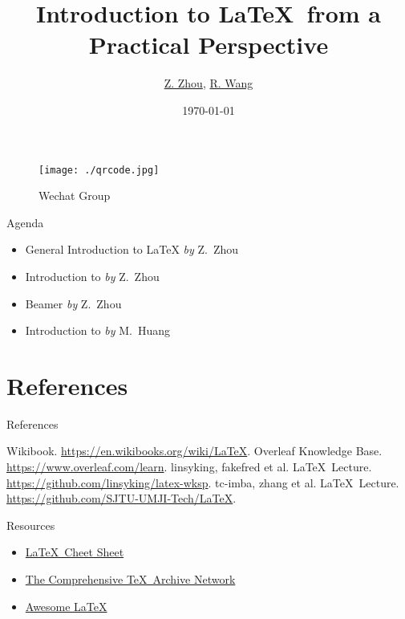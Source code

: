 \documentclass[aspectratio=169]{beamer}
\title{Introduction to \LaTeX\  from a Practical Perspective}
\author{\hyperlink{https://github.com/TechJI-2023/latex_wksp}{Z. Zhou}, \hyperlink{https://github.com/Hydraallen}{R. Wang}}
\institute{TechJI}
\date{\today}
\newcommand{\packagename}[1]{\structure{\texttt{#1}}}
\begin{document}
\begin{frame}
    \titlepage
    \begin{figure}
        \centering
        \caption*{Wechat Group}
        \texttt{[image: ./qrcode.jpg]}
    \end{figure}
\end{frame}

\begin{frame}{Agenda}
    \begin{itemize}
        \item General Introduction to \LaTeX \hspace*{\fill} \textit{by} Z.~Zhou
        \item Introduction to \packagename{Tikz} \hspace*{\fill} \textit{by} Z.~Zhou
        \item Beamer \hspace*{\fill} \textit{by} Z.~Zhou
        \item Introduction to \packagename{Bibtex} \hspace*{\fill} \textit{by} M.~Huang
    \end{itemize}
\end{frame}







\section*{References}

\begin{frame}{References}
    \begin{thebibliography}{9}
        Wikibook. \url{https://en.wikibooks.org/wiki/LaTeX}.
        Overleaf Knowledge Base. \url{https://www.overleaf.com/learn}.
        linsyking, fakefred et al. \LaTeX\ Lecture. \url{https://github.com/linsyking/latex-wksp}.
        tc-imba, zhang et al. \LaTeX\ Lecture. \url{https://github.com/SJTU-UMJI-Tech/LaTeX}.
    \end{thebibliography}
\end{frame}

\begin{frame}{Resources}
    \begin{itemize}
        \item \href{https://wch.github.io/latexsheet/}{\LaTeX\  Cheet Sheet}
        \item \href{https://www.ctan.org/}{The Comprehensive \TeX\ Archive Network}
        \item \href{https://github.com/egeerardyn/awesome-LaTeX}{Awesome \LaTeX}
    \end{itemize}
\end{frame}
\end{document}

